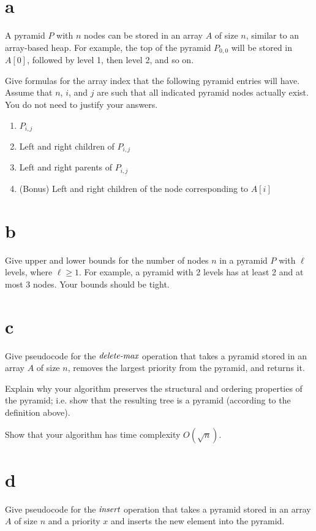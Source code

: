 \documentclass[12pt]{article}
\begin{document}
	\begin{itemize}
		\part{a}
		A pyramid $P$ with $n$ nodes can be stored in an array $A$ of size $n$,
		similar to an array-based heap. 
		For example, the top of the pyramid $P_{0,0}$ will be stored in $A[0]$, followed by level 1, then level 2, and so on.
		
		Give formulas for the array index that the following pyramid entries
		will have. Assume that $n$, $i$, and $j$ are such that all indicated
		pyramid nodes actually exist. You do not need to justify your answers.
		
		\begin{enumerate}
			\item $P_{i,j}$
			\item Left and right children of $P_{i,j}$
			\item Left and right parents of $P_{i,j}$
			\item (Bonus) Left and right children of the node corresponding to $A[i]$
		\end{enumerate}
		
		\part{b}
		Give upper and lower bounds for the number of nodes $n$ in a pyramid $P$
		with $\ell$ levels, where $\ell \geq 1$. For example, a pyramid with 2
		levels has at least 2 and at most 3 nodes. Your bounds should be tight.
		
		\part{c}
		Give pseudocode for the $\emph{delete-max}$ operation that takes a
		pyramid stored in an array $A$ of size $n$, removes the largest priority
		from the pyramid, and returns it.
		
		Explain why your algorithm preserves the structural and ordering properties
		of the pyramid; i.e. show that the resulting tree is a pyramid (according to
		the definition above).
		
		Show that your algorithm has time complexity $O(\sqrt{n})$.
		
		\part{d}
		Give pseudocode for the $\emph{insert}$ operation that takes a pyramid
		stored in an array $A$ of size $n$ and a priority $x$ and inserts the
		new element into the pyramid.
		

\end{itemize}
\end{document}
